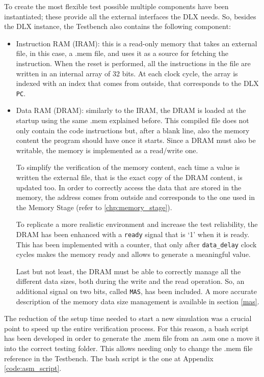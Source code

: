 To create the most flexible test possible multiple components have been instantiated; these provide all the external interfaces the DLX needs. So, besides the DLX instance, the Testbench also contains the following component:
\begin{itemize} 
    \item Instruction RAM (IRAM): this is a read-only memory that takes an external file, in this case, a .mem file, and uses it as a source for fetching the instruction. When the reset is performed, all the instructions in the file are written in an internal array of 32 bits. At each clock cycle, the array is indexed with an index that comes from outside, that corresponds to the DLX \texttt{PC}.
    \item Data RAM (DRAM): similarly to the IRAM, the DRAM is loaded at the startup using the same .mem explained before. This compiled file does not only contain the code instructions but, after a blank line, also the memory content the program should have once it starts. Since a DRAM must also be writable, the memory is implemented as a read/write one. 
    
    To simplify the verification of the memory content, each time a value is written the external file, that is the exact copy of the DRAM content, is updated too.
    In order to correctly access the data that are stored in the memory, the address comes from outside and corresponds to the one used in the Memory Stage (refer to \ref{chp:memory_stage}).
    
    To replicate a more realistic environment and increase the test reliability, the DRAM has been enhanced with a \texttt{ready} signal that is `1' when it is ready. This has been implemented with a counter, that only after \texttt{data\_delay} clock cycles makes the memory ready and allows to generate a meaningful value.
    
    Last but not least, the DRAM must be able to correctly manage all the different data sizes, both during the write and the read operation. So, an additional signal on two bits, called \texttt{MAS}, has been included. A more accurate description of the memory data size management is available in section \ref{mas}.
\end{itemize}

The reduction of the setup time needed to start a new simulation was a crucial point to speed up the entire verification process. For this reason, a bash script has been developed in order to generate the .mem file from an .asm one a move it into the correct testing folder. This allows needing only to change the .mem file reference in the Testbench. The bash script is the one at Appendix \ref{code:asm_script}.



